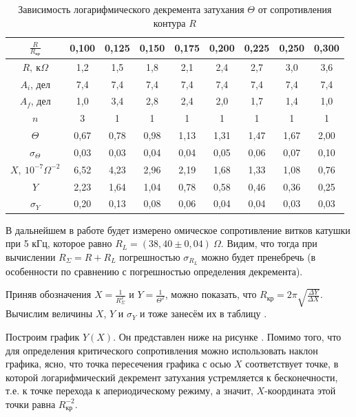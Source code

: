 \documentclass[a4paper,10pt]{article}
\begin{document}
\begin{table}[h]
	\centering
	\caption{Зависимость логарифмического декремента затухания $\Theta$ от сопротивления контура $R$} \label{decr}
	\begin{tabular}{|c|c|c|c|c|c|c|c|c|}
		\hline
		$\frac{R}{R_{\text{кр}}}$ & 0,100 & 0,125 & 0,150 & 0,175 & 0,200 & 0,225 & 0,250 & 0,300 \\ \hline
		$R,\ \text{к}\Omega$ & 1,2 & 1,5 & 1,8 & 2,1 & 2,4 & 2,7 & 3,0 & 3,6 \\ \hline
		$A_i$, дел & 7,4 & 7,4 & 7,4 & 7,4 & 7,4 & 7,4 & 7,4 & 7,4 \\ \hline
		$A_f$, дел & 1,0 & 3,4 & 2,8 & 2,4 & 2,0 & 1,7 & 1,4 & 1,0 \\ \hline
		$n$ & 3 & 1 & 1 & 1 & 1 & 1 & 1 & 1 \\ \hline
		$\Theta$ & 0,67 & 0,78 & 0,98 & 1,13 & 1,31 & 1,47 & 1,67 & 2,00 \\ \hline
		$\sigma_{\Theta}$ & 0,03 & 0,03 & 0,04 & 0,04 & 0,05 & 0,06 & 0,07 & 0,10 \\ \hline
		$X,\ 10^{-7}\Omega^{-2}$ & 6,52 & 4,23 & 2,96 & 2,19 & 1,68 & 1,33 & 1,08 & 0,76 \\ \hline
		$Y$ & 2,23 & 1,64 & 1,04 & 0,78 & 0,58 & 0,46 & 0,36 & 0,25 \\ \hline
		$\sigma_Y$ & 0,20 & 0,13 & 0,08 & 0,06 & 0,04 & 0,04 & 0,03 & 0,03 \\ \hline
	\end{tabular}
\end{table}

В дальнейшем в работе будет измерено омическое сопротивление витков катушки при 5 кГц, которое равно $R_L=\left(38,40\pm0,04\right)~\Omega$. Видим, что тогда при вычислении $R_{\Sigma}=R+R_L$ погрешностью $\sigma_{R_L}$ можно будет пренебречь (в особенности по сравнению с погрешностью определения декремента).

Приняв обозначения $X=\frac{1}{R_{\Sigma}^2}$ и $Y=\frac{1}{\Theta^2}$, можно показать, что $R_{\text{кр}}=2\pi\sqrt{\frac{\Delta Y}{\Delta X}}$. Вычислим величины $X$, $Y$ и $\sigma_Y$ и тоже занесём их в таблицу .

Построим график $Y(X)$. Он представлен ниже на рисунке . Помимо того, что для определения критического сопротивления можно использовать наклон графика, ясно, что точка пересечения графика с осью $X$ соответствует точке, в которой логарифмический декремент затухания устремляется к бесконечности, т.е. к точке перехода к апериодическому режиму, а значит, $X$-координата этой точки равна $R_{\text{кр}}^{-2}$.
\end{document}
